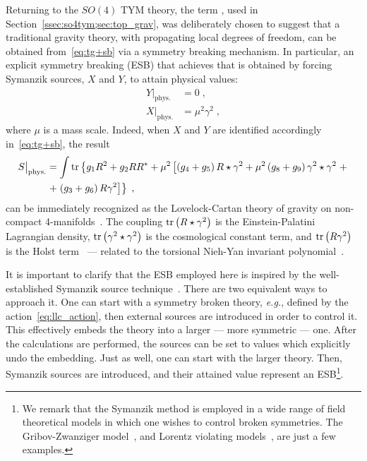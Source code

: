 \documentclass[../main.tex]{subfiles}
\begin{document}
Returning to the $SO(4)$ TYM theory, the term , used in Section~\ref{ssec:so4tym;sec:top_grav}, was deliberately chosen to suggest that a traditional gravity theory, with propagating local degrees of freedom, can be obtained from~\eqref{eq:tg+sb} via a symmetry breaking mechanism. In particular, an explicit symmetry breaking (ESB) that achieves that is obtained by forcing Symanzik sources, $X$ and $Y$, to attain physical values:
\begin{subequations}%
  \label{eq:physicalxy}
  \begin{align}
    Y\big|_{\text{phys.}} & = 0 \;, \label{eq:physicalsource1}              \\
    X\big|_{\text{phys.}} & = \mu^2 \gamma^2 \;, \label{eq:physicalsource2}
  \end{align}
\end{subequations}
where $\mu$ is a mass scale. Indeed, when $X$ and $Y$ are identified accordingly in~\eqref{eq:tg+sb}, the result
\begin{align}
  \label{eq:llc_action}
  S\big|_{\text{phys.}} & = \int \operatorname{tr} \left\{ g_1 R^2 + g_2 R R^* + \mu^2 \left[ \left( g_4 + g_5 \right) R \star \gamma^2 + \mu^2 \left( g_8 + g_9 \right) \gamma^2 \star \gamma^2  \right. + \right. \nonumber \\
                        & \left. + \left. \left( g_3 + g_6 \right) R \gamma^2 \right] \right\} \;,
\end{align}
can be immediately recognized as the Lovelock-Cartan theory of gravity on non-compact 4-manifolds~\cite{mardones1991a,hassaine2016a,corichi2016a}. The coupling $\operatorname{tr} \left( R \star \gamma^2 \right)$ is the Einstein-Palatini Lagrangian density, $\operatorname{tr} \left( \gamma^2 \star \gamma^2 \right)$ is the cosmological constant term, and $\operatorname{tr} \left( R \gamma^2 \right)$ is the Holst term~\cite{holst1996a} --- related to the torsional Nieh-Yan invariant polynomial~\cite{nieh1982a,chandia1997a,nieh2007a}.

It is important to clarify that the ESB employed here is inspired by the well-established Symanzik source technique~\cite{symanzik1970a}. There are two equivalent ways to approach it. One can start with a symmetry broken theory, \textit{e.g.}, defined by the action~\eqref{eq:llc_action}, then external sources are introduced in order to control it. This effectively embeds the theory into a larger --- more symmetric --- one. After the calculations are performed, the sources can be set to values which explicitly undo the embedding. Just as well, one can start with the larger theory. Then, Symanzik sources are introduced, and their attained value represent an ESB\footnote{We remark that the Symanzik method is employed in a wide range of field theoretical models in which one wishes to control broken symmetries. The Gribov-Zwanziger model~\cite{zwanziger1981a,zwanziger1989a,dudal2005a,vandersickel2012a}, and Lorentz violating models~\cite{sobreiro2015a,sobreiro2016b,sobreiro2017b}, are just a few examples.}.
\end{document}
